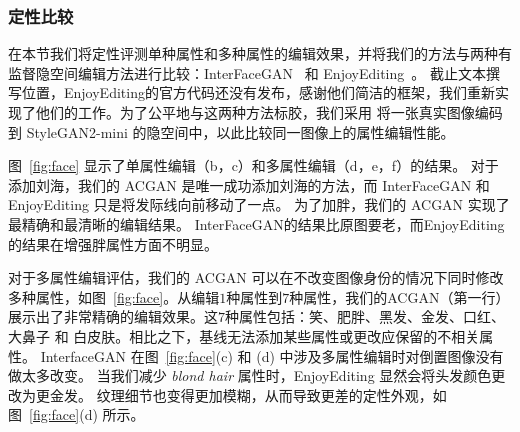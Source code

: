 \subsubsection{定性比较}
在本节我们将定性评测单种属性和多种属性的编辑效果，并将我们的方法与两种有监督隐空间编辑方法进行比较：InterFaceGAN~\cite{interfacegan} 和 EnjoyEditing~\cite{iclr2021}。 截止文本撰写位置，EnjoyEditing的官方代码还没有发布，感谢他们简洁的框架，我们重新实现了他们的工作。为了公平地与这两种方法标胶，我们采用 \cite{image2stylegan} 将一张真实图像编码到 StyleGAN2-mini 的隐空间中，以此比较同一图像上的属性编辑性能。

图~\ref{fig:face} 显示了单属性编辑（b，c）和多属性编辑（d，e，f）的结果。 对于添加刘海，我们的 ACGAN 是唯一成功添加刘海的方法，而 InterFaceGAN 和 EnjoyEditing 只是将发际线向前移动了一点。 为了加胖，我们的 ACGAN 实现了最精确和最清晰的编辑结果。 InterFaceGAN的结果比原图要老，而EnjoyEditing的结果在增强胖属性方面不明显。

对于多属性编辑评估，我们的 ACGAN 可以在不改变图像身份的情况下同时修改多种属性，如图~\ref{fig:face}。从编辑$1$种属性到$7$种属性，我们的ACGAN（第一行）展示出了非常精确的编辑效果。这$7$种属性包括：笑、肥胖、黑发、金发、口红、大鼻子 和 白皮肤。相比之下，基线无法添加某些属性或更改应保留的不相关属性。 InterfaceGAN 在图~\ref{fig:face}(c) 和 (d) 中涉及多属性编辑时对倒置图像没有做太多改变。 当我们减少 \textit{blond hair} 属性时，EnjoyEditing 显然会将头发颜色更改为更金发。 纹理细节也变得更加模糊，从而导致更差的定性外观，如图~\ref{fig:face}(d) 所示。

